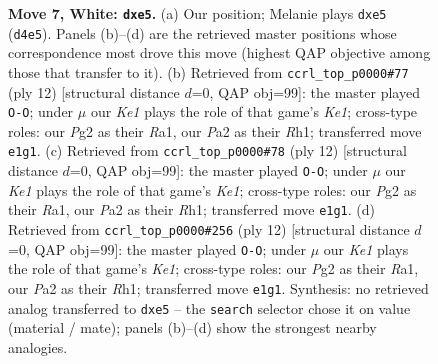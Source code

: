 \documentclass[11pt]{article}
\begin{document}
\begin{figure}[p]
\caption{\textbf{Move 7, White: \texttt{dxe5}.} (a) Our position; Melanie plays \texttt{dxe5} (\texttt{d4e5}). Panels (b)--(d) are the retrieved master positions whose correspondence most drove this move (highest QAP objective among those that transfer to it). (b) Retrieved from \texttt{ccrl\_top\_p0000\#77} (ply 12) [structural distance $d$=0, QAP obj=99]: the master played \texttt{O-O}; under $\mu$ our \emph{Ke1} plays the role of that game's \emph{Ke1}; cross-type roles: our \emph{P}g2 as their \emph{R}a1, our \emph{P}a2 as their \emph{R}h1; transferred move \texttt{e1g1}. (c) Retrieved from \texttt{ccrl\_top\_p0000\#78} (ply 12) [structural distance $d$=0, QAP obj=99]: the master played \texttt{O-O}; under $\mu$ our \emph{Ke1} plays the role of that game's \emph{Ke1}; cross-type roles: our \emph{P}g2 as their \emph{R}a1, our \emph{P}a2 as their \emph{R}h1; transferred move \texttt{e1g1}. (d) Retrieved from \texttt{ccrl\_top\_p0000\#256} (ply 12) [structural distance $d$=0, QAP obj=99]: the master played \texttt{O-O}; under $\mu$ our \emph{Ke1} plays the role of that game's \emph{Ke1}; cross-type roles: our \emph{P}g2 as their \emph{R}a1, our \emph{P}a2 as their \emph{R}h1; transferred move \texttt{e1g1}. Synthesis: no retrieved analog transferred to \texttt{dxe5} -- the \texttt{search} selector chose it on value (material / mate); panels (b)--(d) show the strongest nearby analogies.}
\label{fig:thought-m12}
\end{figure}

\clearpage
\end{document}
